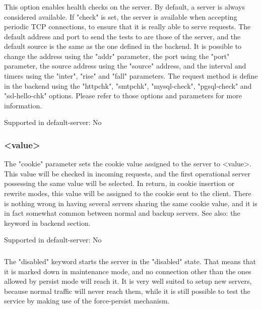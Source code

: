 \subsubsection[check]{}
  This option enables health checks on the server. By default, a server is
  always considered available. If "check" is set, the server is available when
  accepting periodic TCP connections, to ensure that it is really able to serve
  requests. The default address and port to send the tests to are those of the
  server, and the default source is the same as the one defined in the
  backend. It is possible to change the address using the "addr" parameter, the
  port using the "port" parameter, the source address using the "source"
  address, and the interval and timers using the "inter", "rise" and "fall"
  parameters. The request method is define in the backend using the "httpchk",
  "smtpchk", "mysql-check", "pgsql-check" and "ssl-hello-chk" options. Please
  refer to those options and parameters for more information.

  Supported in default-server: No

\subsubsection[cookie]{ <value>}
  The "cookie" parameter sets the cookie value assigned to the server to
  <value>. This value will be checked in incoming requests, and the first
  operational server possessing the same value will be selected. In return, in
  cookie insertion or rewrite modes, this value will be assigned to the cookie
  sent to the client. There is nothing wrong in having several servers sharing
  the same cookie value, and it is in fact somewhat common between normal and
  backup servers. See also: the  keyword in backend section.

  Supported in default-server: No

\subsubsection[disabled]{}
  The "disabled" keyword starts the server in the "disabled" state. That means
  that it is marked down in maintenance mode, and no connection other than the
  ones allowed by persist mode will reach it. It is very well suited to setup
  new servers, because normal traffic will never reach them, while it is still
  possible to test the service by making use of the force-persist mechanism.

